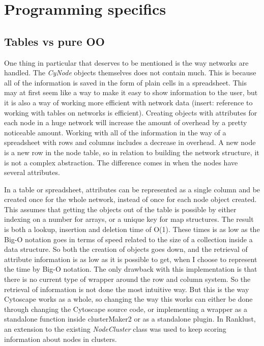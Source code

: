 \chapter{Programming specifics}
\section{Tables vs pure OO}
One thing in particular that deserves to be mentioned is the way networks are
handled. The \textit{CyNode} objects themselves does not contain much. This is
because all of the information is saved in the form of plain cells in a
spreadsheet. This may at first seem like a way to make it easy to show
information to the user, but it is also a way of working more efficient with
network data (insert: reference to working with tables on networks is
efficient). Creating objects with attributes for each node in a huge network
will increase the amount of overhead by a pretty noticeable amount. Working with
all of the information in the way of a spreadsheet with rows and columns
includes a decrease in overhead. A new node is a new row in the node table, so
in relation to building the network structure, it is not a complex abstraction.
The difference comes in when the nodes have several attributes. 

In a table or spreadsheet, attributes can be represented as a single column and
be created once for the whole network, instead of once for each node object
created. This assumes that getting the objects out of the table is possible by
either indexing on a number for arrays, or a unique key for map structures.
The result is both a lookup, insertion and deletion time of O(1). These times is
as low as the Big-O notation goes in terms of speed related to the size of
a collection inside a data structure. So both the creation of objects goes
down, and the retrieval of attribute information is as low as it is possible to
get, when I choose to represent the time by Big-O notation. The only drawback
with this implementation is that there is no current type of wrapper around the
row and column system. So the retrieval of information is not done the most
intuitive way. But this is the way Cytoscape works as a whole, so changing the
way this works can either be done through changing the Cytoscape source code, or
implementing a wrapper as a standalone function inside clusterMaker2 or as
a standalone plugin. In Ranklust, an extension to the existing
\textit{NodeCluster} class was used to keep scoring information about nodes in
clusters.


